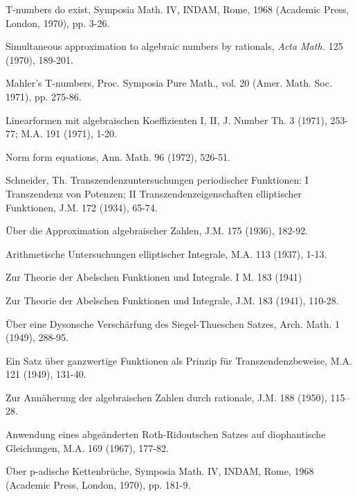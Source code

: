 \begin{hanglist}
    \item \hspace{1.5em} T-numbers do exist, Symposia Math. IV, INDAM, Rome, 1968 (Academic Press, London, 1970), pp. 3-26.
    \item \hspace{1.5em} Simultaneous approximation to algebraic numbers by rationals, \textit{Acta Math.} 125 (1970), 189-201.
    \item \hspace{1.5em} Mahler's T-numbers, Proc. Symposia Pure Math., vol. 20 (Amer. Math. Soc. 1971), pp. 275-86.
    \item \hspace{1.5em} Linearformen mit algebraischen Koeffizienten I, II, J. Number Th. 3 (1971), 253-77; M.A. 191 (1971), 1-20.
    \item \hspace{1.5em} Norm form equations, Ann. Math. 96 (1972), 526-51.
    \item Schneider, Th. Transzendenzuntersuchungen periodischer Funktionen: I Transzendenz von Potenzen; II Transzendenzeigenschaften elliptischer Funktionen, J.M. 172 (1934), 65-74.
    \item Über die Approximation algebraischer Zahlen, J.M. 175 (1936), 182-92.
    \item Arithmetische Untersuchungen elliptischer Integrale, M.A. 113 (1937), 1-13.
    \item Zur Theorie der Abelschen Funktionen und Integrale. I M. 183 (1941)
    \item Zur Theorie der Abelschen Funktionen und Integrale, J.M. 183 (1941), 110-28.
    \item Über eine Dysonsche Verschärfung des Siegel-Thueschen Satzes, Arch. Math. 1 (1949), 288-95.
    \item Ein Satz über ganzwertige Funktionen als Prinzip für Transzendenzbeweise, M.A. 121 (1949), 131-40.
    \item Zur Annäherung der algebraischen Zahlen durch rationale, J.M. 188 (1950), 115–28.
    \item Anwendung eines abgeänderten Roth-Ridoutschen Satzes auf diophantische Gleichungen, M.A. 169 (1967), 177-82.
    \item Über p-adische Kettenbrüche, Symposia Math. IV, INDAM, Rome, 1968 (Academic Press, London, 1970), pp. 181-9.

\end{hanglist}
